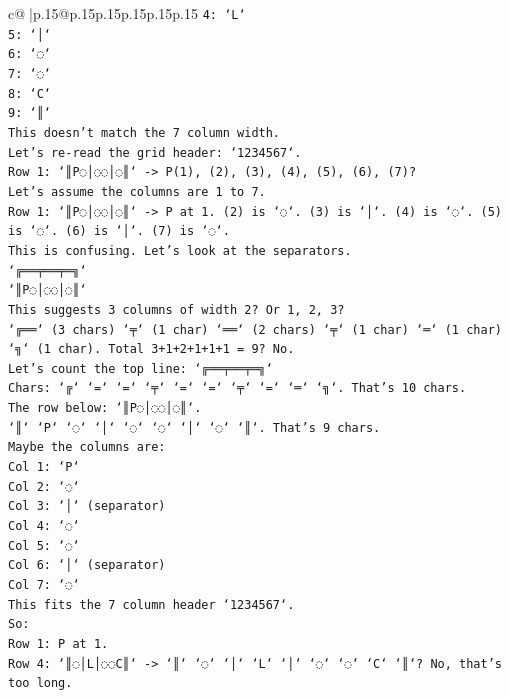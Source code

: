 \documentclass{article}
\begin{document}
{\begin{supertabular}{c@{$\;$}|p{.15\linewidth}@{}p{.15\linewidth}p{.15\linewidth}p{.15\linewidth}p{.15\linewidth}p{.15\linewidth}}
{{{\texttt{4: `L`} \\
\texttt{5: `│`} \\
\texttt{6: `◌`} \\
\texttt{7: `◌`} \\
\texttt{8: `C`} \\
\texttt{9: `║`} \\
\texttt{This doesn't match the 7 column width.} \\
\texttt{Let's re{-}read the grid header: `1234567`.} \\
\texttt{Row 1: `║P◌│◌◌│◌║` {-}> P(1), (2), (3), (4), (5), (6), (7)?} \\
\texttt{Let's assume the columns are 1 to 7.} \\
\texttt{Row 1: `║P◌│◌◌│◌║` {-}> P at 1. (2) is `◌`. (3) is `│`. (4) is `◌`. (5) is `◌`. (6) is `│`. (7) is `◌`.} \\
\texttt{This is confusing. Let's look at the separators.} \\
\texttt{`╔══╤══╤═╗`} \\
\texttt{`║P◌│◌◌│◌║`} \\
\texttt{This suggests 3 columns of width 2? Or 1, 2, 3?} \\
\texttt{`╔══` (3 chars) `╤` (1 char) `══` (2 chars) `╤` (1 char) `═` (1 char) `╗` (1 char). Total 3+1+2+1+1+1 = 9? No.} \\
\texttt{Let's count the top line: `╔══╤══╤═╗`} \\
\texttt{Chars: `╔` `=` `=` `╤` `=` `=` `╤` `=` `═` `╗`. That's 10 chars.} \\
\texttt{The row below: `║P◌│◌◌│◌║`.} \\
\texttt{`║` `P` `◌` `│` `◌` `◌` `│` `◌` `║`. That's 9 chars.} \\
\texttt{Maybe the columns are:} \\
\texttt{Col 1: `P`} \\
\texttt{Col 2: `◌`} \\
\texttt{Col 3: `│` (separator)} \\
\texttt{Col 4: `◌`} \\
\texttt{Col 5: `◌`} \\
\texttt{Col 6: `│` (separator)} \\
\texttt{Col 7: `◌`} \\
\texttt{This fits the 7 column header `1234567`.} \\
\texttt{So:} \\
\texttt{Row 1: P at 1.} \\
\texttt{Row 4: `║◌│L│◌◌C║` {-}> `║` `◌` `│` `L` `│` `◌` `◌` `C` `║`? No, that's too long.} \\
}}}
\end{supertabular}}
\end{document}
